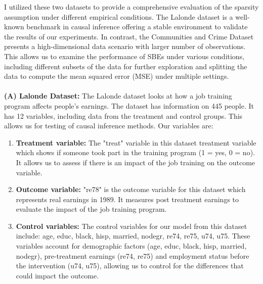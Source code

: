 I utilized these two datasets to provide a comprehensive evaluation of the sparsity
assumption under different empirical conditions. The Lalonde dataset is a well-
known benchmark in causal inference offering a stable environment to validate the
results of our experiments. In contrast, the Communities and Crime Dataset
presents a high-dimensional data scenario with larger number of observations. This
allows us to examine the performance of SBEs under various conditions, including
different subsets of the data for further exploration and splitting the data to compute the mean squared error (MSE) under multiple settings.\\
\\
\textbf{(A) Lalonde Dataset:} The Lalonde dataset looks at how a job training program affects people's earnings. The dataset has information on 445 people. It has 12 variables, including data from the treatment and control groups. This allows us for testing of causal inference methods. Our variables are:
\begin{enumerate}
    \item \textbf{Treatment variable:} The "treat" variable in this dataset treatment variable which shows if someone took part in the training program (1 = yes, 0 = no). It allows us to assess if there is an impact of the job training on the outcome variable. 
    \item \textbf{Outcome variable:} "re78" is the outcome variable for this dataset which represents real earnings in 1989. It measures post treatment earnings to evaluate the impact of the job training program. 
    \item \textbf{Control variables:} The control variables for our model from this dataset include: age, educ, black, hisp, married, nodegr, re74, re75, u74, u75. These variables account for demographic factors (age, educ, black, hisp, married, nodegr), pre-treatment earnings (re74, re75) and employment status before the intervention (u74, u75), allowing us to control for the differences that could impact the outcome. 
\end{enumerate}

